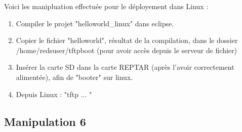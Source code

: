 Voici les manipluation effectuée pour le déployement dans Linux :
\begin{enumerate}
\item Compiler le projet "helloworld\_linux" dans eclipse.
\item Copier le fichier "helloworld", résultat de la compilation, dans le dossier /home/redsuser/tftpboot (pour avoir accès depuis le serveur de fichier)
\item Insérer la carte SD dans la carte REPTAR (après l'avoir correctement alimentée), afin de "booter" sur linux.
\item Depuis Linux : "tftp ... "
\end{enumerate}

\pagebreak
\subsection{Manipulation 6}

